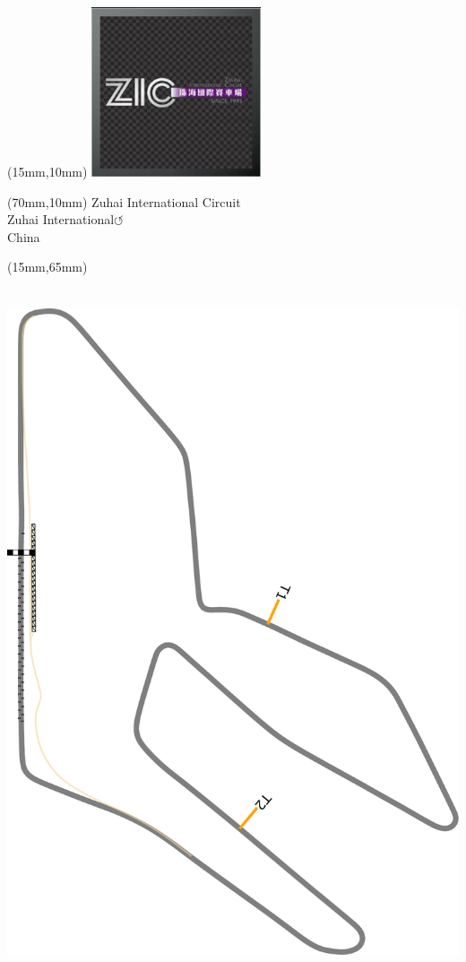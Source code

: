 \null\newpage
\begin{textblock*}{50mm}(15mm,10mm)%
\includegraphics[width=50mm]{LG/2015-05-20_00099.png}
\end{textblock*}
\begin{textblock*}{130mm}(70mm,10mm)%
{\fontsize{20}{20}\selectfont Zuhai International Circuit\\}
{\fontsize{16}{16}\selectfont Zuhai International\hfill \huge$\circlearrowleft$\\}
{\fontsize{12}{12}\selectfont China\\}
\end{textblock*}
\begin{textblock*}{185mm}(15mm,65mm)%
\centering
\mbox{\includegraphics[width=185mm,height=210mm,keepaspectratio]{PT/ZUIC.pdf}}
\end{textblock*}
